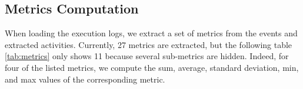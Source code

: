 \subsection{Metrics Computation}

When loading the execution logs, we extract a set of metrics from the events and extracted activities. Currently, 27 metrics are extracted, but the following table \ref{tab:metrics} only shows 11 because several sub-metrics are hidden. Indeed, for four of the listed metrics, we compute the sum, average, standard deviation, min, and max values of the corresponding metric.


